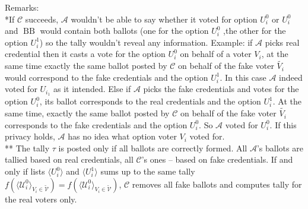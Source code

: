 \documentclass[12pt]{article}
\DeclareMathOperator{\bb}{BB}
\begin{document}
Remarks:\\
*If  $\mathcal{C}$ succeeds, $\mathcal{A}$ wouldn't be able to say whether it voted for option $U_i^0$ or $U_i^0$ and $\bb$ would contain both ballots (one for the option $U_i^0$ ,the other for the option $U_i^1$) so the tally wouldn't reveal any information. Example: if $\mathcal{A}$  picks real credential then it casts a vote for the option  $U_i^0$ on behalf of a voter $V_i$, at the same time exactly the same ballot posted by $\mathcal{C}$ on behalf of the fake voter $\tilde{V_i}$ would correspond to the fake credentials and the option $U_i^1$. In this case $\mathcal{A}$ indeed voted for $U_{i_1}$ as it intended. Else if $\mathcal{A}$ picks the fake credentials and votes for the option $U_i^0$,  its ballot corresponds to the real credentials and  the option $U_i^1$. At the same time, exactly the same ballot posted by $\mathcal{C}$ on behalf of the fake voter $\tilde{V_i}$ corresponds to the fake credentials  and the option $U_i^0$. So $\mathcal{A}$  voted for $U_i^0$. If this privacy holds,  $\mathcal{A}$ has no idea what option voter $V_i$ voted for. \\
** The tally $\tau$ is posted only if all ballots are correctly formed. All $\mathcal{A}$'s ballots are tallied based on real credentials, all   $\mathcal{C}$'s ones -- based on fake credentials. If and only if lists $\langle U^0_i \rangle$ and $\langle U^1_i \rangle$ sums up to the same tally $f(\langle \mathcal{U}^0_i \rangle _{V_i \in \tilde{\mathcal{V}}} ) = f(\langle \mathcal{U}^0_i \rangle _{V_i \in \tilde{\mathcal{V}}})$, $\mathcal{C}$ removes all fake ballots and computes tally for the real voters only. \\
\end{document}
